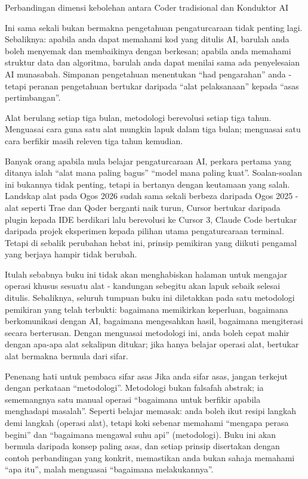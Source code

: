 \begin{center}\small\color{gray}Perbandingan dimensi kebolehan antara Coder tradisional dan Konduktor AI\end{center}

Ini sama sekali bukan bermakna pengetahuan pengaturcaraan tidak penting lagi. Sebaliknya: apabila anda dapat memahami kod yang ditulis AI, barulah anda boleh menyemak dan membaikinya dengan berkesan; apabila anda memahami struktur data dan algoritma, barulah anda dapat menilai sama ada penyelesaian AI munasabah. Simpanan pengetahuan menentukan “had pengarahan” anda - tetapi peranan pengetahuan bertukar daripada “alat pelaksanaan” kepada “asas pertimbangan”.


Alat berulang setiap tiga bulan, metodologi berevolusi setiap tiga tahun. Menguasai cara guna satu alat mungkin lapuk dalam tiga bulan; menguasai satu cara berfikir masih releven tiga tahun kemudian.

Banyak orang apabila mula belajar pengaturcaraan AI, perkara pertama yang ditanya ialah “alat mana paling bagus” “model mana paling kuat”. Soalan-soalan ini bukannya tidak penting, tetapi ia bertanya dengan keutamaan yang salah. Landskap alat pada Ogos 2026 sudah sama sekali berbeza daripada Ogos 2025 - alat seperti Trae dan Qoder berganti naik turun, Cursor bertukar daripada plugin kepada IDE berdikari lalu berevolusi ke Cursor 3, Claude Code bertukar daripada projek eksperimen kepada pilihan utama pengaturcaraan terminal. Tetapi di sebalik perubahan hebat ini, prinsip pemikiran yang diikuti pengamal yang berjaya hampir tidak berubah.

Itulah sebabnya buku ini tidak akan menghabiskan halaman untuk mengajar operasi khusus sesuatu alat - kandungan sebegitu akan lapuk sebaik selesai ditulis. Sebaliknya, seluruh tumpuan buku ini diletakkan pada satu metodologi pemikiran yang telah terbukti: bagaimana memikirkan keperluan, bagaimana berkomunikasi dengan AI, bagaimana mengesahkan hasil, bagaimana mengiterasi secara berterusan. Dengan menguasai metodologi ini, anda boleh cepat mahir dengan apa-apa alat sekalipun ditukar; jika hanya belajar operasi alat, bertukar alat bermakna bermula dari sifar.

\begin{tcbinfo}{Penenang hati untuk pembaca sifar asas}
Jika anda sifar asas, jangan terkejut dengan perkataan “metodologi”. Metodologi bukan falsafah abstrak; ia sememangnya satu manual operasi “bagaimana untuk berfikir apabila menghadapi masalah”. Seperti belajar memasak: anda boleh ikut resipi langkah demi langkah (operasi alat), tetapi koki sebenar memahami “mengapa perasa begini” dan “bagaimana mengawal suhu api” (metodologi). Buku ini akan bermula daripada konsep paling asas, dan setiap prinsip disertakan dengan contoh perbandingan yang konkrit, memastikan anda bukan sahaja memahami “apa itu”, malah menguasai “bagaimana melakukannya”.

\end{tcbinfo}

